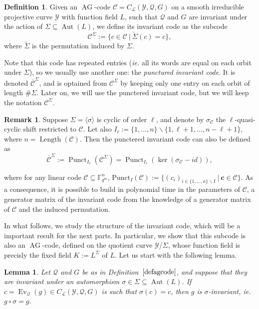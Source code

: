 \documentclass[10pt]{article}
\newtheorem{lem1}[thm]{Lemma}
\theoremstyle{definition}
\newtheorem{rq1}[thm]{Remark}
\theoremstyle{definition}
\theoremstyle{definition}
\newtheorem{def1}[thm]{Definition}
\newcommand{\C}{\mathcal{C}}
\newcommand{\fqm}{\mathbb{F}_{q^m}}
\newcommand{\su}{\subseteq}
\newcommand{\Y}{\mathcal{Y}}
\newcommand{\QR}{\mathcal{Q}}
\newcommand{\Aut}{\operatorname{Aut}}
\newcommand{\ag}{\operatorname{AG}}
\newcommand{\calL}{\mathcal{L}}
\begin{document}
\begin{def1} Given an $\ag$-code $\mathcal{C} = C_{\calL}(\Y,\QR,G)$ on a smooth irreducible projective curve $\Y$ with function field $L$, such that $\QR$ and $G$ are invariant under the action of $\Sigma \su \Aut(L)$, we define its invariant code as the subcode 
\[\mathcal{C}^{\Sigma} := \{c \in \mathcal{C} \ | \ \tilde{\Sigma}(c)=c\},\]
where $\tilde{\Sigma}$ is the permutation induced by $\Sigma$.
\end{def1}


Note that this code has repeated entries (\textit{ie.} all its words are equal on each orbit under $\Sigma$), so we usually use another one: the \emph{punctured invariant code}. It is denoted $\overline{\mathcal{C}}^{\Sigma}$, and is optained from $\C^{\Sigma}$ by keeping only one entry on each orbit of length $\#\Sigma$. Later on, we will use the punctered invariant code, but we will keep the notation $\mathcal{C}^{\Sigma}$. 

\begin{rq1}  \label{gen inv}
Suppose $\Sigma = \langle \sigma \rangle$ is cyclic of order $\ell$, and denote by $\sigma_{\mathcal{C}}$ the $\ell$-quasi-cyclic shift restricted to $\mathcal{C}$. Let also $I_{\ell} := \{1,...,n\}\backslash \{1,\ell+1,...,n-\ell+1\}$, where $n=\operatorname{Length}(\mathcal{C})$. Then the punctered invariant code can also be defined as
\[ \overline{\mathcal{C}}^{\Sigma} := \operatorname{Punct}_{I_{\ell}}(\mathcal{C}^{\Sigma}) = \operatorname{Punct}_{ I_{\ell}}(\ker (\sigma_{\mathcal{C}}-id)),\]

\noindent where for any linear code $\mathcal{C} \su \fqm^n$, $\mathrm{Punct}_I(\mathcal{C}):= \{(c_i)_{i \in \{1,...,n\}\backslash I} \ | \ \mathbf{c} \in \mathcal{C}\}$. 
As a consequence, it is possible to build in polynomial time in the parameters of $\mathcal{C}$, a generator matrix of the invariant code from the knowledge of a generator matrix of $\mathcal{C}$ and the induced permutation. 
\end{rq1}

In what follows, we study the structure of the invariant code, which will be a important result for the next parts. In particular, we show that this subcode is also an $\ag$-code, defined on the quotient curve $\Y/\Sigma$, whose function field is precisly the fixed field $K:=L^{\Sigma}$ of $L$. Let us start with the following lemma.

\begin{lem1} \label{inv}
Let $\QR$ and $G$ be as in Definition~$\ref{defagcode}$, and suppose that they are invariant under an automorphism $\sigma \in \Sigma \su \Aut(L)$. If $c = \operatorname{Ev}_{\QR}(g) \in C_{\calL}(\Y,\QR,G)$ is such that $\sigma(c) = c$, then $g$ is $\sigma$-invariant, ie. $g\circ \sigma = g$. 
\end{lem1}
\end{document}
